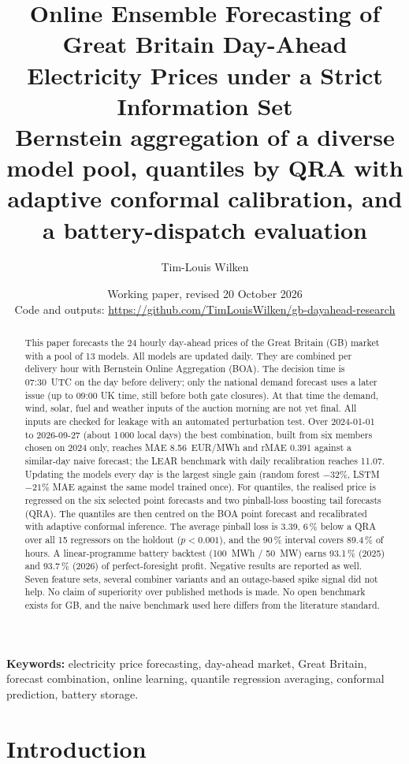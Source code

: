 \documentclass[11pt,a4paper]{article}
\title{\textbf{Online Ensemble Forecasting of Great Britain Day-Ahead Electricity Prices under a Strict Information Set}\\[4pt]
\large Bernstein aggregation of a diverse model pool, quantiles by QRA with adaptive conformal calibration, and a battery-dispatch evaluation}
\author{Tim-Louis Wilken}
\date{Working paper, revised 20 October 2026\\[2pt]
\small Code and outputs: \url{https://github.com/TimLouisWilken/gb-dayahead-research}}
\begin{document}
\maketitle

\begin{abstract}
\noindent
This paper forecasts the 24 hourly day-ahead prices of the Great Britain (GB) market with a pool of 13 models. All models are updated daily. They are combined per delivery hour with Bernstein Online Aggregation (BOA). The decision time is 07:30~UTC on the day before delivery; only the national demand forecast uses a later issue (up to 09:00 UK time, still before both gate closures). At that time the demand, wind, solar, fuel and weather inputs of the auction morning are not yet final. All inputs are checked for leakage with an automated perturbation test. Over 2024-01-01 to 2026-09-27 (about 1\,000 local days) the best combination, built from six members chosen on 2024 only, reaches MAE 8.56~EUR/MWh and rMAE 0.391 against a similar-day naive forecast; the LEAR benchmark with daily recalibration reaches 11.07. Updating the models every day is the largest single gain (random forest $-32\%$, LSTM $-21\%$ MAE against the same model trained once). For quantiles, the realised price is regressed on the six selected point forecasts and two pinball-loss boosting tail forecasts (QRA). The quantiles are then centred on the BOA point forecast and recalibrated with adaptive conformal inference. The average pinball loss is 3.39, 6\,\% below a QRA over all 15 regressors on the holdout ($p<0.001$), and the 90\,\% interval covers 89.4\,\% of hours. A linear-programme battery backtest (100~MWh / 50~MW) earns 93.1\,\% (2025) and 93.7\,\% (2026) of perfect-foresight profit. Negative results are reported as well. Seven feature sets, several combiner variants and an outage-based spike signal did not help. No claim of superiority over published methods is made. No open benchmark exists for GB, and the naive benchmark used here differs from the literature standard.
\end{abstract}

\noindent\textbf{Keywords:} electricity price forecasting, day-ahead market, Great Britain, forecast combination, online learning, quantile regression averaging, conformal prediction, battery storage.

\section{Introduction}
\end{document}
